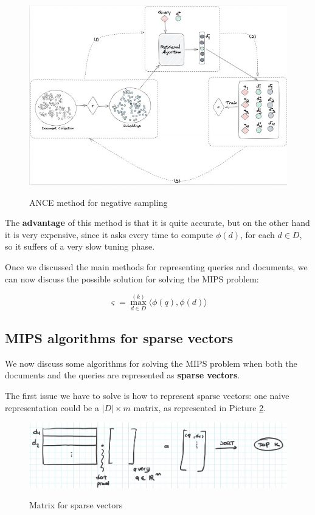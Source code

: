 \begin{figure}[h!]
		\centering
		\includegraphics[scale = 1.8]{img/negative sampling 2.jpg}
        \label{negative 2}
        \caption{ANCE method for negative sampling}
\end{figure}

The \textbf{advantage} of this method is that it is quite accurate, but on the other hand it is very expensive, since it asks every time to compute $\phi(d)$, for each $d \in D$, so it suffers of a very slow tuning phase.

Once we discussed the main methods for representing queries and documents, we can now discuss the possible solution for solving the MIPS problem:

$$
\varsigma = \max_{d \in D}^{(k)} \langle \phi(q),\phi(d) \rangle
$$

\subsection{MIPS algorithms for sparse vectors}\label{mips for sparse}
We now discuss some algorithms for solving the MIPS problem when both the documents and the queries are represented as \textbf{sparse vectors}.

The first issue we have to solve is how to represent sparse vectors: one naive representation could be a $|D| \times m$ matrix, as represented in Picture \ref{matrix}.

\begin{figure}[h!]
		\centering
		\includegraphics[scale = 1.5]{img/matrix.jpg}
        \label{matrix}
        \caption{Matrix for sparse vectors}
\end{figure}


